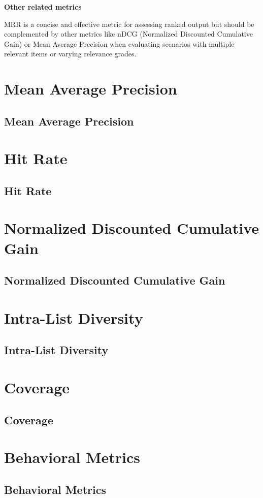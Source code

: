 \clearpage

\thispagestyle{customstyle}

\textbf{Other related metrics}

MRR is a concise and effective metric for assessing ranked output but should be complemented by other metrics like
nDCG (Normalized Discounted Cumulative Gain) or Mean Average Precision when evaluating scenarios with multiple relevant
items or varying relevance grades.


\clearpage
\thispagestyle{rankingstyle}
\section{Mean Average Precision}
\subsection{Mean Average Precision}

\clearpage
\thispagestyle{rankingstyle}
\section{Hit Rate}
\subsection{Hit Rate}

\clearpage
\thispagestyle{rankingstyle}
\section{Normalized Discounted Cumulative Gain}
\subsection{Normalized Discounted Cumulative Gain}

\clearpage
\thispagestyle{rankingstyle}
\section{Intra-List Diversity}
\subsection{Intra-List Diversity}

\clearpage
\thispagestyle{rankingstyle}
\section{Coverage}
\subsection{Coverage}

\clearpage
\thispagestyle{rankingstyle}
\section{Behavioral Metrics}
\subsection{Behavioral Metrics}


